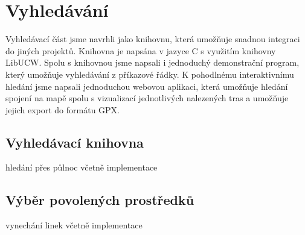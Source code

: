 \section{Vyhledávání}
\label{ch:implementace:vyhledavani}
Vyhledávací část jsme navrhli jako knihovnu, která umožňuje snadnou integraci do
jiných projektů. Knihovna je napsána v jazyce C s využitím knihovny LibUCW.
Spolu s knihovnou jsme napsali i jednoduchý demonstrační program, který umožňuje
vyhledávání z příkazové řádky. K pohodlnému interaktivnímu hledání jsme napsali
jednoduchou webovou aplikaci, která umožňuje hledání spojení na mapě spolu s
vizualizací jednotlivých nalezených tras a umožňuje jejich export do formátu
GPX.

\subsection{Vyhledávací knihovna}
\TODO hledání přes půlnoc včetně implementace
\subsection{Výběr povolených prostředků}
\TODO vynechání linek včetně implementace
